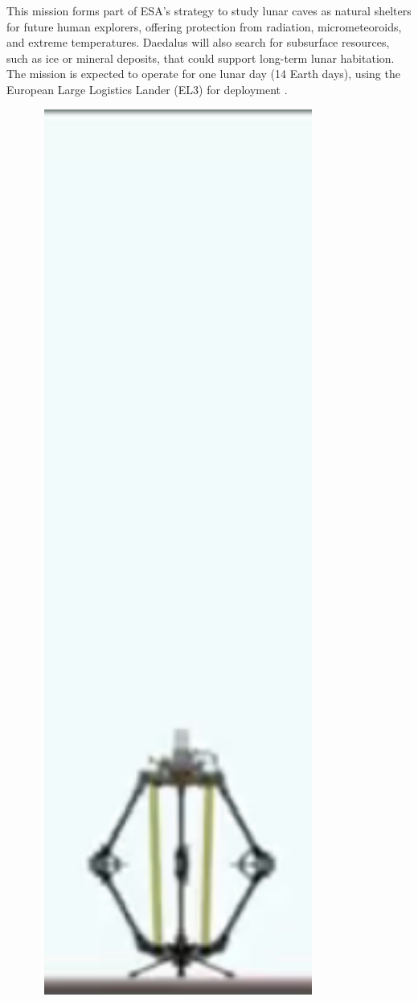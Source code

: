 This mission forms part of ESA’s strategy to study lunar caves as natural shelters for future human explorers, offering protection from radiation, micrometeoroids, and extreme temperatures. Daedalus will also search for subsurface resources, such as ice or mineral deposits, that could support long-term lunar habitation. The mission is expected to operate for one lunar day (14 Earth days), using the European Large Logistics Lander (EL3) for deployment \cite{esa-daedalus}.

\begin{figure}[H]
    \centering
    \begin{minipage}[b]{0.15\textwidth}
        \centering
        \includegraphics[width=0.82\textwidth]{daedalus-jumper-1.png}

\end{minipage}
\end{figure}
